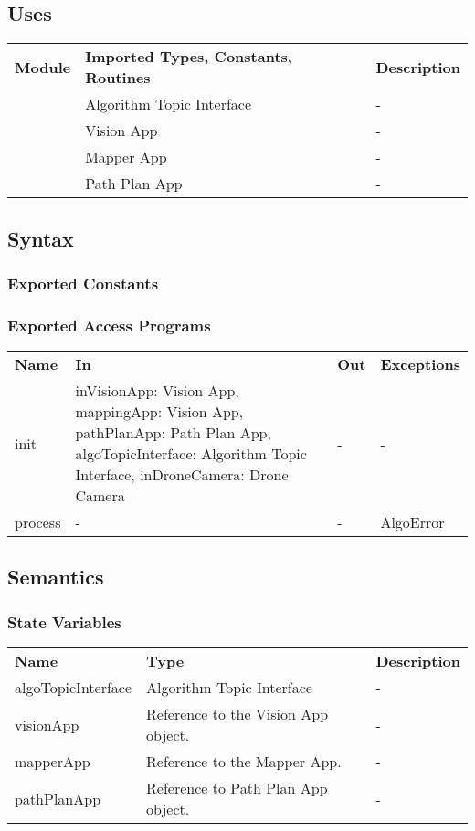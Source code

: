 \documentclass[12pt, titlepage]{article}
\begin{document}
\subsection{Uses}
\begin{center}
\begin{tabular}{p{2 cm} p{5cm} p{6.5cm} } 
\hline
\textbf{Module} & \textbf{Imported Types, Constants, Routines} & \textbf{Description} \\
\nameref{Algorithm Topic Interface} & Algorithm Topic Interface & - \\
\nameref{Vision App} & Vision App  & - \\
\nameref{Mapper App} & Mapper App  & - \\
\nameref{Path Plan App} & Path Plan App  & - \\
\hline
\hline
\end{tabular}
\end{center}
\subsection{Syntax}
\subsubsection{Exported Constants}
\subsubsection{Exported Access Programs}
\begin{center}
\begin{tabular}{p{3.5cm} p{2.5cm} p{2.5cm} p{5cm}}
\hline
\textbf{Name} & \textbf{In} & \textbf{Out} & \textbf{Exceptions} \\
init & inVisionApp: Vision App, mappingApp: Vision App, pathPlanApp: Path Plan App, algoTopicInterface: Algorithm Topic Interface, inDroneCamera: Drone Camera  & - & - \\
process & -  & - & AlgoError \\
\hline
\hline
\end{tabular}
\end{center}
\subsection{Semantics}
\subsubsection{State Variables}
\begin{center}
\begin{tabular}{p{3 cm} p{4cm} p{5cm} }
\hline
\textbf{Name} & \textbf{Type} & \textbf{Description}  \\
algoTopicInterface & Algorithm Topic Interface & - \\
visionApp & Reference to the Vision App object. & - \\
mapperApp & Reference to the Mapper App. & - \\
pathPlanApp & Reference to Path Plan App object. & - \\
\hline
\hline
\end{tabular}
\end{center}
\end{document}
